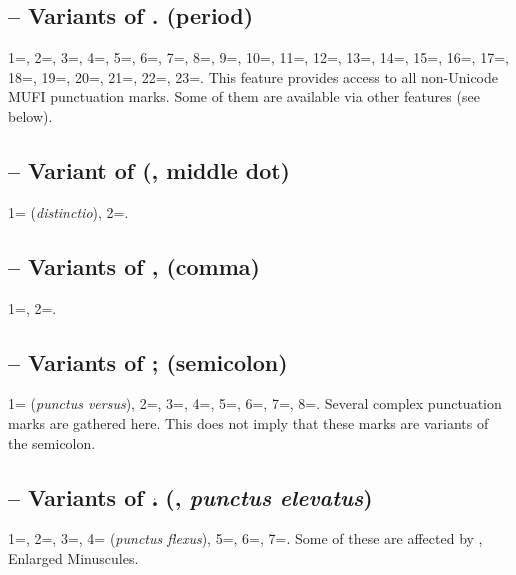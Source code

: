 \subsection{ –
  Variants of . (period)}
1=, 2=, 3=, 4=, 5=, 6=,
7=, 8=, 9=, 10=, 11=, 12=,
13=, 14=, 15=, 16=, 17=,
18=, 19=, 20=, 21=, 22=,
23=. This feature provides access to all non-Unicode MUFI punctuation marks. Some of them 
are available via other features (see below).

\subsection{ – Variant of {\textperiodcentered} (, middle dot)}
1= (\textit{distinctio}), 2=.

\subsection{ –
Variants of , (comma)}
1=, 2=.

\subsection{ –
Variants of ; (semicolon)}
1= (\textit{punctus versus}), 2=, 3=, 4=,
5=, 6=, 7=, 8=. Several complex
punctuation marks are gathered here. This does not imply that these marks are variants of
the semicolon.

\subsection{ – Variants of ⹎ (, \textit{punctus elevatus})}
1=, 2=, 3=, 4= (\textit{punctus flexus}),
5=, 6=, 7=. Some of these are affected by ,
Enlarged Minuscules.

